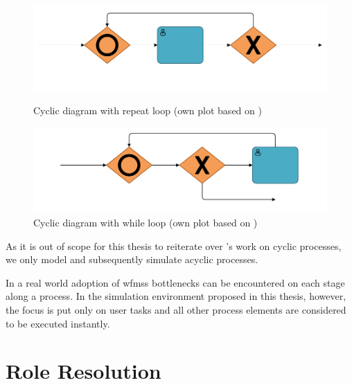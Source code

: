 \begin{figure}[!ht]
	\centering
	\begin{minipage}[b]{0.45\textwidth}
		\includegraphics[width=\textwidth]{img/repeat_loops}
		\caption{Cyclic diagram with repeat loop (own plot based on \citet[p. 12]{Soerensen2005})}
		\label{fig:repeat_loops}
	\end{minipage}
	\hfill
	\begin{minipage}[b]{0.45\textwidth}
		\includegraphics[width=\textwidth]{img/while_loops}
		\caption{Cyclic diagram with while loop (own plot based on \citet[p. 12]{Soerensen2005})}
		\label{fig:while_loops}
	\end{minipage}
\end{figure}

As it is out of scope for this thesis to reiterate over \citet{Soerensen2005}'s work on cyclic processes, we only model and subsequently simulate acyclic processes.

In a real world adoption of \glspl{wfms} bottlenecks can be encountered on each stage along a process. In the simulation environment proposed in this thesis, however, the focus is put only on user tasks and all other process elements are considered to be executed instantly.

\section{Role Resolution}
\label{sec:role_resolution_theory}

